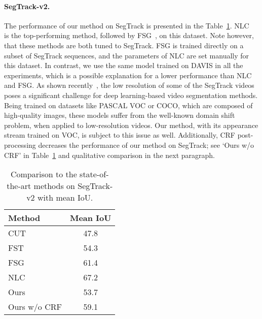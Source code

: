 \paragraph{\bf SegTrack-v2.}
The performance of our method on SegTrack is presented in the
Table~\ref{tbl:strck}. NLC~\cite{Faktor14} is the top-performing method,
followed by FSG~\cite{jain2017fusionseg}, on this dataset. Note however, that
these methods are both tuned to SegTrack. FSG is trained directly on a subset
of SegTrack sequences, and the parameters of NLC are set manually for this
dataset. In contrast, we use the same model trained on DAVIS in all the experiments, which is
a possible explanation for a lower performance than NLC and FSG. As
shown recently~\cite{jain2017fusionseg,Khoreva16}, the low resolution of some
of the SegTrack videos poses a significant challenge for deep learning-based
video segmentation methods. Being trained on datasets like PASCAL VOC or COCO,
which are composed of high-quality images, these models suffer from the
well-known domain shift problem, when applied to low-resolution videos. Our
method, with its appearance stream trained on VOC, is subject to this issue as
well. Additionally, CRF post-processing decreases the performance of our method
on SegTrack; see `Ours w/o CRF' in Table~\ref{tbl:strck} and qualitative comparison in the next paragraph.
\begin{table}[t]
\begin{center}
\begin{tabular}{l | c}
\hline
Method & Mean IoU \\
\hline
CUT~\cite{keuper2015motion} & 47.8 \\
FST~\cite{papazoglou2013fast} & 54.3 \\
FSG~\cite{jain2017fusionseg} & 61.4 \\
NLC~\cite{Faktor14} & 67.2 \\
Ours & 53.7 \\
Ours w/o CRF & 59.1 \\
\hline
\end{tabular}
\caption{Comparison to the state-of-the-art methods on SegTrack-v2 with mean
IoU.}
\label{tbl:strck}
\end{center}
\end{table}

